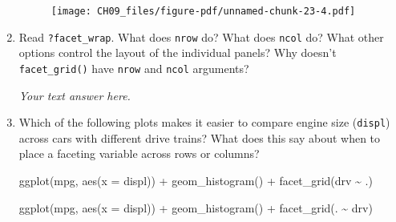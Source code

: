 \documentclass[
  letterpaper,
  DIV=11,
  numbers=noendperiod]{scrreprt}
\newenvironment{Shaded}{\begin{snugshade}}{\end{snugshade}}
\newcommand{\AttributeTok}[1]{\textcolor[rgb]{0.40,0.45,0.13}{#1}}
\newcommand{\FunctionTok}[1]{\textcolor[rgb]{0.28,0.35,0.67}{#1}}
\newcommand{\NormalTok}[1]{\textcolor[rgb]{0.00,0.23,0.31}{#1}}
\newcommand{\SpecialCharTok}[1]{\textcolor[rgb]{0.37,0.37,0.37}{#1}}
\begin{document}
\begin{enumerate}
\begin{tcolorbox}
  \begin{figure}[H]

  {\centering \texttt{[image: CH09\_files/figure-pdf/unnamed-chunk-23-4.pdf]}

  }

  \end{figure}

  \end{tcolorbox}
\item
  Read \texttt{?facet\_wrap}. What does \texttt{nrow} do? What does
  \texttt{ncol} do? What other options control the layout of the
  individual panels? Why doesn't \texttt{facet\_grid()} have
  \texttt{nrow} and \texttt{ncol} arguments?

  \begin{tcolorbox}[enhanced jigsaw, left=2mm, rightrule=.15mm, bottomtitle=1mm, opacitybacktitle=0.6, leftrule=.75mm, opacityback=0, colframe=quarto-callout-note-color-frame, bottomrule=.15mm, coltitle=black, toptitle=1mm, colback=white, titlerule=0mm, colbacktitle=quarto-callout-note-color!10!white, title={Answer}, toprule=.15mm, breakable, arc=.35mm]

  \emph{Your text answer here.}

  \end{tcolorbox}
\item
  Which of the following plots makes it easier to compare engine size
  (\texttt{displ}) across cars with different drive trains? What does
  this say about when to place a faceting variable across rows or
  columns?

\begin{Shaded}
\begin{Highlighting}[]
\FunctionTok{ggplot}\NormalTok{(mpg, }\FunctionTok{aes}\NormalTok{(}\AttributeTok{x =}\NormalTok{ displ)) }\SpecialCharTok{+} 
  \FunctionTok{geom\_histogram}\NormalTok{() }\SpecialCharTok{+} 
  \FunctionTok{facet\_grid}\NormalTok{(drv }\SpecialCharTok{\textasciitilde{}}\NormalTok{ .)}
\end{Highlighting}
\end{Shaded}

\begin{Shaded}
\begin{Highlighting}[]
\FunctionTok{ggplot}\NormalTok{(mpg, }\FunctionTok{aes}\NormalTok{(}\AttributeTok{x =}\NormalTok{ displ)) }\SpecialCharTok{+} 
  \FunctionTok{geom\_histogram}\NormalTok{() }\SpecialCharTok{+}
  \FunctionTok{facet\_grid}\NormalTok{(. }\SpecialCharTok{\textasciitilde{}}\NormalTok{ drv)}
\end{Highlighting}
\end{Shaded}


\end{enumerate}
\end{document}
